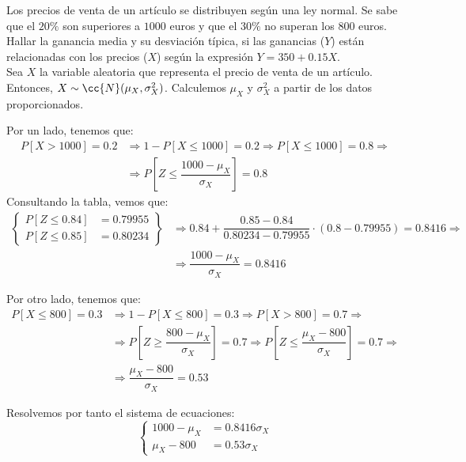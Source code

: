 \begin{ejercicio}
    Los precios de venta de un artículo se distribuyen según una ley normal. Se sabe que el $20\%$ son superiores a $1000$ euros y que el $30\%$ no superan los $800$ euros. Hallar la ganancia media y su desviación típica, si las ganancias ($Y$) están relacionadas con los precios ($X$) según la expresión $Y = 350+0.15X$.\\

    Sea $X$ la variable aleatoria que representa el precio de venta de un artículo. Entonces, $X\sim \cc{N}(\mu_X,\sigma^2_X)$. Calculemos $\mu_X$ y $\sigma^2_X$ a partir de los datos proporcionados.
    
    Por un lado, tenemos que:
    \begin{align*}
        P[X>1000] = 0.2 &\Longrightarrow 1-P[X\leq 1000] = 0.2 \Longrightarrow P[X\leq 1000] = 0.8 \Longrightarrow
        \\&\Longrightarrow P\left[Z\leq \dfrac{1000-\mu_X}{\sigma_X}\right] = 0.8
    \end{align*}
    Consultando la tabla, vemos que:
    \begin{align*}
        \left\{
            \begin{aligned}
                P[Z\leq 0.84] &= 0.79955\\
                P[Z\leq 0.85] &= 0.80234
            \end{aligned}
        \right\} &\Longrightarrow 0.84 + \dfrac{0.85-0.84}{0.80234-0.79955} \cdot (0.8-0.79955) = 0.8416
        \Longrightarrow \\
        &\Longrightarrow \dfrac{1000-\mu_X}{\sigma_X} = 0.8416
    \end{align*}

    Por otro lado, tenemos que:
    \begin{align*}
        P[X\leq 800] = 0.3 &\Longrightarrow 1-P[X\leq 800] = 0.3 \Longrightarrow P[X>800] = 0.7 \Longrightarrow
        \\&\Longrightarrow P\left[Z\geq \dfrac{800-\mu_X}{\sigma_X}\right] = 0.7
        \Longrightarrow P\left[Z\leq \dfrac{\mu_X-800}{\sigma_X}\right] = 0.7 \Longrightarrow \\
        &\Longrightarrow \dfrac{\mu_X-800}{\sigma_X} = 0.53
    \end{align*}

    Resolvemos por tanto el sistema de ecuaciones:
    \begin{equation*}
        \left\{
            \begin{aligned}
                1000-\mu_X &= 0.8416\sigma_X\\
                \mu_X-800 &= 0.53\sigma_X
            \end{aligned}
        \right.
    \end{equation*}


\end{ejercicio}
